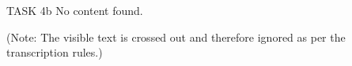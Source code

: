 TASK 4b  
No content found.  

(Note: The visible text is crossed out and therefore ignored as per the transcription rules.)